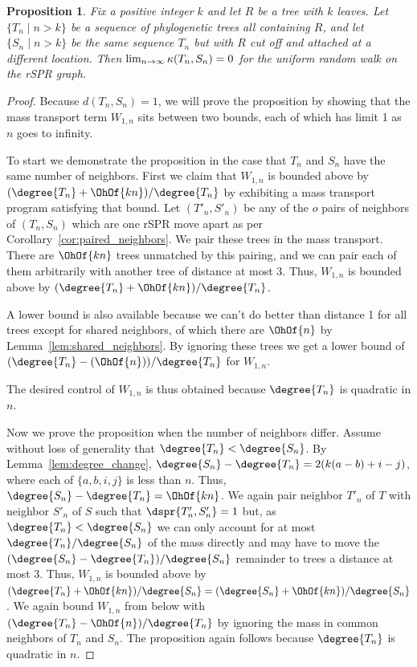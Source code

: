 \documentclass[11pt,onecolumn,conference]{IEEEtran}
\newtheorem{proposition}[theorem]{Proposition}
\newcommand{\curvature}[2][]{%
    \ifthenelse{\equal{#1}{}}%
		{\kappa(#2)}%
		{\kappa_{#1}(#2)}%
}
\begin{document}
\begin{proposition}
Fix a positive integer $k$ and let $R$ be a tree with $k$ leaves.
Let $\{T_n \mid n > k\}$ be a sequence of phylogenetic trees all containing $R$, and let $\{S_n \mid n > k\}$ be the same sequence $T_n$ but with $R$ cut off and attached at a different location.
Then $\lim_{n \rightarrow \infty} \curvature{T_n,S_n} = 0$ for the uniform random walk on the rSPR graph.
\end{proposition}
\begin{proof}
Because $d(T_n, S_n) = 1$, we will prove the proposition by showing that the mass transport term $W_{1,n}$ sits between two bounds, each of which has limit 1 as $n$ goes to infinity.

To start we demonstrate the proposition in the case that $T_n$ and $S_n$ have the same number of neighbors.
First we claim that $W_{1,n}$ is bounded above by $(\degree{T_n}+\OhOf{kn})/\degree{T_n}$ by exhibiting a mass transport program satisfying that bound.
Let $(T'_n, S'_n)$ be any of the $o$ pairs of neighbors of $(T_n, S_n)$ which are one rSPR move apart as per Corollary~\ref{cor:paired_neighbors}.
We pair these trees in the mass transport.
There are $\OhOf{kn}$ trees unmatched by this pairing, and we can pair each of them arbitrarily with another tree of distance at most 3.
Thus, $W_{1,n}$ is bounded above by $(\degree{T_n} + \OhOf{kn}) / \degree{T_n}$.

A lower bound is also available because we can't do better than distance 1 for all trees except for shared neighbors, of which there are $\OhOf{n}$ by Lemma~\ref{lem:shared_neighbors}.
By ignoring these trees we get a lower bound of $(\degree{T_n} - (\OhOf{n}))/\degree{T_n}$ for $W_{1,n}$.

The desired control of $W_{1,n}$ is thus obtained because $\degree{T_n}$ is quadratic in $n$.

Now we prove the proposition when the number of neighbors differ.
Assume without loss of generality that $\degree{T_n} < \degree{S_n}$.
By Lemma~\ref{lem:degree_change}, $\degree{S_n} - \degree{T_n} = 2(k(a-b) + i - j)$, where each of $\{a,b,i,j\}$ is less than $n$.
Thus, $\degree{S_n} - \degree{T_n} = \OhOf{kn}$.
We again pair neighbor $T'_n$ of $T$ with neighbor $S'_n$ of $S$ such that $\dspr{T'_n, S'_n}=1$ but, as $\degree{T_n} < \degree{S_n}$ we can only account for at most $\degree{T_n} / \degree{S_n}$ of the mass directly and may have to move the $(\degree{S_n} - \degree{T_n}) / \degree{S_n}$ remainder to trees a distance at most 3.
Thus, $W_{1,n}$ is bounded above by $(\degree{T_n} + \OhOf{kn}) / \degree{S_n} = (\degree{S_n} + \OhOf{kn}) / \degree{S_n}$.
We again bound $W_{1,n}$ from below with $(\degree{T_n} - \OhOf{n}) / \degree{T_n}$ by ignoring the mass in common neighbors of $T_n$ and $S_n$.
The proposition again follows because $\degree{T_n}$ is quadratic in $n$.
\end{proof}
\end{document}
